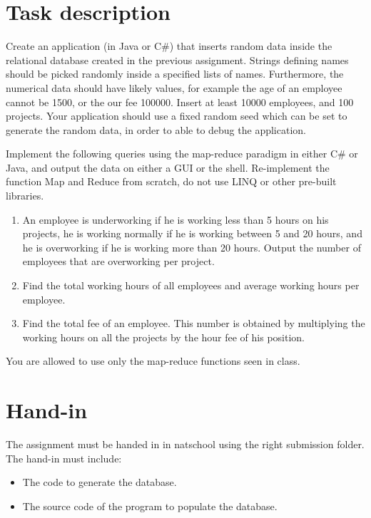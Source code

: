 \documentclass[10pt,a4paper]{article}
\begin{document}
\section*{Task description}
Create an application (in Java or C\#) that inserts random data inside the relational database created in the previous assignment. Strings defining names should be picked randomly inside a specified lists of names. Furthermore, the numerical data should have likely values, for example the age of an employee cannot be 1500, or the our fee 100000. Insert at least 10000 employees, and 100 projects. Your application should use a fixed random seed which can be set to generate the random data, in order to able to debug the application.

Implement the following queries using the map-reduce paradigm in either C\# or Java, and output the data on either a GUI or the shell. Re-implement the function Map and Reduce from scratch, do not use LINQ or other pre-built libraries.

\begin{enumerate}
	\item An employee is underworking if he is working less than 5 hours on his projects, he is working normally if he is working between 5 and 20 hours, and he is overworking if he is working more than 20 hours. Output the number of employees that are overworking per project.
	\item Find the total working hours of all employees and average working hours per employee.
	\item Find the total fee of an employee. This number is obtained by multiplying the working hours on all the projects by the hour fee of his position.
\end{enumerate}

You are allowed to use only the map-reduce functions seen in class.

\section*{Hand-in}
The assignment must be handed in in natschool using the right submission folder. The hand-in must include:
\begin{itemize}
	\item The code to generate the database.
	\item The source code of the program to populate the database.
\end{itemize}
\end{document}
